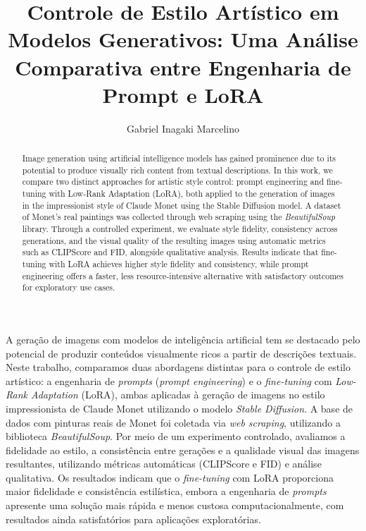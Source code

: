 \documentclass[12pt]{article}
\title{Controle de Estilo Artístico em Modelos Generativos: Uma Análise Comparativa entre Engenharia de Prompt e LoRA}
\author{Gabriel Inagaki Marcelino}
\begin{document}
 

\maketitle

\begin{abstract}
    Image generation using artificial intelligence models has gained prominence due to its potential to produce visually rich content from textual descriptions. In this work, we compare two distinct approaches for artistic style control: prompt engineering and fine-tuning with Low-Rank Adaptation (LoRA), both applied to the generation of images in the impressionist style of Claude Monet using the Stable Diffusion model. A dataset of Monet’s real paintings was collected through web scraping using the \textit{BeautifulSoup} library. Through a controlled experiment, we evaluate style fidelity, consistency across generations, and the visual quality of the resulting images using automatic metrics such as CLIPScore and FID, alongside qualitative analysis. Results indicate that fine-tuning with LoRA achieves higher style fidelity and consistency, while prompt engineering offers a faster, less resource-intensive alternative with satisfactory outcomes for exploratory use cases.
\end{abstract}
     
\begin{resumo} 
    A geração de imagens com modelos de inteligência artificial tem se destacado pelo potencial de produzir conteúdos visualmente ricos a partir de descrições textuais. Neste trabalho, comparamos duas abordagens distintas para o controle de estilo artístico: a engenharia de \textit{prompts} (\textit{prompt engineering}) e o \textit{fine-tuning} com \textit{Low-Rank Adaptation} (LoRA), ambas aplicadas à geração de imagens no estilo impressionista de Claude Monet utilizando o modelo \textit{Stable Diffusion}. A base de dados com pinturas reais de Monet foi coletada via \textit{web scraping}, utilizando a biblioteca \textit{BeautifulSoup}. Por meio de um experimento controlado, avaliamos a fidelidade ao estilo, a consistência entre gerações e a qualidade visual das imagens resultantes, utilizando métricas automáticas (CLIPScore e FID) e análise qualitativa. Os resultados indicam que o \textit{fine-tuning} com LoRA proporciona maior fidelidade e consistência estilística, embora a engenharia de \textit{prompts} apresente uma solução mais rápida e menos custosa computacionalmente, com resultados ainda satisfatórios para aplicações exploratórias.
\end{resumo}






\end{document}
